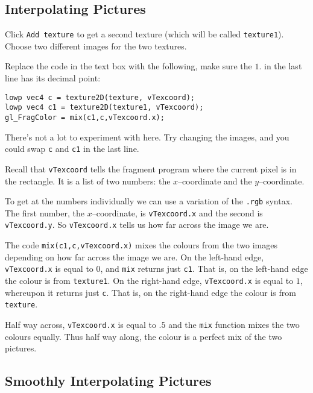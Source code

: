 \documentclass[
  html5,%
  mathml,%
  use filename%
]{internet}
\begin{document}
\subsection{Interpolating Pictures}

Click \verb+Add texture+ to get a second texture (which will be called \verb+texture1+).
Choose two different images for the two textures.

Replace the code in the text box with the following, make sure the \(1.\) in the last line has its decimal point:

\begin{tcolorbox}
\begin{verbatim}
lowp vec4 c = texture2D(texture, vTexcoord);
lowp vec4 c1 = texture2D(texture1, vTexcoord);
gl_FragColor = mix(c1,c,vTexcoord.x);
\end{verbatim}
\end{tcolorbox}

There's not a lot to experiment with here.
Try changing the images, and you could swap \verb+c+ and \verb+c1+ in the last line.

\begin{tcolorbox}
Recall that \verb+vTexcoord+ tells the fragment program where the current pixel is in the rectangle.
It is a list of two numbers: the \(x\)--coordinate and the \(y\)--coordinate.

To get at the numbers individually we can use a variation of the \verb!.rgb! syntax.
The first number, the \(x\)--coordinate, is \verb+vTexcoord.x+ and the second is \verb+vTexcoord.y+.
So \verb+vTexcoord.x+ tells us how far across the image we are.

The code \verb!mix(c1,c,vTexcoord.x)! mixes the colours from the two images depending on how far across the image we are.
On the left-hand edge, \verb+vTexcoord.x+ is equal to \(0\), and \verb!mix! returns just \verb+c1+.
That is, on the left-hand edge the colour is from \verb+texture1+.
On the right-hand edge, \verb+vTexcoord.x+ is equal to \(1\), whereupon it returns just \verb+c+.
That is, on the right-hand edge the colour is from \verb+texture+.

Half way across, \verb+vTexcoord.x+ is equal to \(.5\) and the \verb!mix! function mixes the two colours equally.
Thus half way along, the colour is a perfect mix of the two pictures.
\end{tcolorbox}

\subsection{Smoothly Interpolating Pictures}
\label{task:interpolating}
\end{document}

